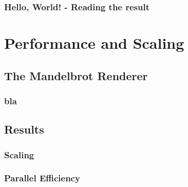 \documentclass{beamer}
\begin{document}
\begin{frame}
    \frametitle{Hello, World! - Reading the result}
\end{frame}


\section{Performance and Scaling}

\subsection{The Mandelbrot Renderer} %
\begin{frame}
    \frametitle{bla}
\end{frame}

\subsection{Results}

\begin{frame}
    \frametitle{Scaling}
\end{frame}

\begin{frame}
    \frametitle{Parallel Efficiency}
\end{frame}
\end{document}
